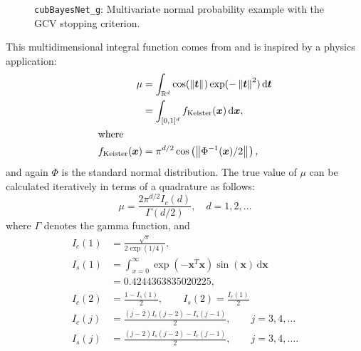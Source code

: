 \documentclass{iitthesis}          %
\newcommand{\bm}[1]{\boldsymbol{#1}}
\newcommand{\dif}[1]{\text{d}{#1}}
\newcommand{\reals}{\mathbb{R}}
\newcommand{\vt}{\bm{t}}
\newcommand{\vx}{\bm{x}}
\newcommand{\dvx}{\dif{\bm{x}}}
\newcommand{\dvt}{\dif{\bm{t}}}
\newcommand{\code}[1]{\texttt{#1}}
\newcommand{\norm}[2][{}]{\ensuremath{\left \lVert #2 \right \rVert}_{#1}}
\begin{document}
{{{{{{\begin{figure}
\caption[Sobol: MVN guaranteed: GCV]{\code{cubBayesNet\_g}: Multivariate normal probability example with the GCV stopping criterion.}
\label{fig:Sobol-mvn-guaranteed-GCV}
\end{figure}







This multidimensional integral function comes from \cite{Kei96} and is inspired by a physics application:
\begin{align}
\label{eqn:keister_integral}
\mu & =  \int_{\reals^d} \cos(\norm{ \vt}) \exp(-\norm{ \vt }^2) \, \dvt \\
\nonumber
& = \int_{[0,1]^d} f_{\textup{Keister}}(\vx) \, \dvx,\\
\intertext{where }
\nonumber
f_\textup{Keister}(\vx) &= \pi^{d/2} \cos\left(\norm{ \Phi^{-1}(\vx)/2}\right)  ,
\end{align}
and again $\Phi$ is the standard normal distribution.
The true value of $\mu$ can be calculated iteratively in terms of a quadrature as follows:  
\begin{equation*}
\mu = \frac{2 \pi^{d/2} I_c(d)}{\Gamma(d/2)}, \quad d=1,2, \ldots
\end{equation*}
where $\Gamma$ denotes the gamma function, and
\begin{align*}
I_c(1) &= \frac{\sqrt{\pi}}{2 \exp(1/4)}, 
\\
I_s(1) &= \int_{x=0}^\infty \exp(-\vx^T\vx)\sin(\vx) \, \dvx 
\\
& =  0.4244363835020225,
\\
I_c(2) &= \frac{1-I_s(1)}{2}, \qquad
I_s(2) = \frac{I_c(1)}{2}
\\
I_c(j) &= \frac{(j-2)I_c(j-2)-I_s(j-1)}{2},
\qquad j =3,4,\ldots
\\
I_s(j) &= \frac{(j-2)I_s(j-2)-I_c(j-1)}{2},
\qquad j =3,4,\ldots.
\end{align*}

}}}}}}
\end{document}
